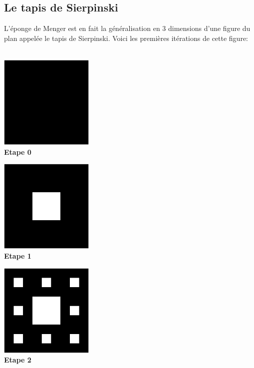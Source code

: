 \subsection{Le tapis de Sierpinski}
\noindent L'éponge de Menger est en fait la généralisation en 3 dimensions d'une figure du plan appelée le tapis de Sierpinski. Voici les premières itérations de cette figure:\\ \\
\begin{minipage}{4.5cm}
\begin{center}
 \includegraphics[width=4.5cm]{images/carpet0.png}\\
\textbf{Etape 0}
\end{center}
\end{minipage}
\begin{minipage}{4.5cm}
\begin{center}
 \includegraphics[width=4.5cm]{images/carpet1.png}\\
\textbf{Etape 1}
\end{center}
\end{minipage}
\begin{minipage}{4.5cm}
\begin{center}
 \includegraphics[width=4.5cm]{images/carpet2.png}\\
\textbf{Etape 2}
\end{center}
\end{minipage}
